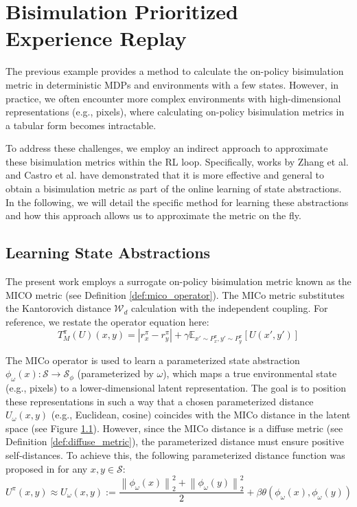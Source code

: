 \section{Bisimulation Prioritized Experience Replay}

The previous example provides a method to calculate the on-policy bisimulation metric in deterministic MDPs and environments with a few states. However, in practice, we often encounter more complex environments with high-dimensional representations (e.g., pixels), where calculating on-policy bisimulation metrics in a tabular form becomes intractable.

To address these challenges, we employ an indirect approach to approximate these bisimulation metrics within the RL loop. Specifically, works by Zhang et al. \cite{zhang2020learning} and Castro et al. \cite{castro2021mico} have demonstrated that it is more effective and general to obtain a bisimulation metric as part of the online learning of state abstractions. In the following, we will detail the specific method for learning these abstractions and how this approach allows us to approximate the metric on the fly.

\subsection{Learning State Abstractions}

The present work employs a surrogate on-policy bisimulation metric known as the MICO metric \cite{castro2021mico} (see Definition \ref{def:mico_operator}). The MICo metric substitutes the Kantorovich distance $\mathcal{W}_d$ calculation with the independent coupling. For reference, we restate the operator equation here:
$$
\label{eq:mico_operator}
    T^\pi_M(U)(x, y) = |r^\pi_{x} - r^\pi_{y}| + \gamma \mathbb{E}_{x'\sim P_x^\pi, y'\sim P_y^\pi}\left[U(x',y') \right]
$$


The MICo operator is used to learn a parameterized state abstraction \(\phi_\omega(x) : \mathcal{S} \to \mathcal{S}_\phi\) (parameterized by \(\omega\)), which maps a true environmental state (e.g., pixels) to a lower-dimensional latent representation. The goal is to position these representations in such a way that a chosen parameterized distance $U_\omega(x,y)$ (e.g., Euclidean, cosine) coincides with the MICo distance in the latent space (see Figure \ref{}). However, since the MICo distance is a diffuse metric (see Definition \ref{def:diffuse_metric}), the parameterized distance must ensure positive self-distances. To achieve this, the following parameterized distance function was proposed in \cite{castro2021mico} for any \(x, y \in \mathcal{S}\):
\begin{equation}
    U^\pi(x, y) \approx U_\omega(x, y):=\frac{\left\|\phi_\omega(x)\right\|_2^2+\left\|\phi_\omega(y)\right\|_2^2}{2}+\beta \theta\left(\phi_\omega(x), \phi_\omega(y)\right)
\end{equation}

